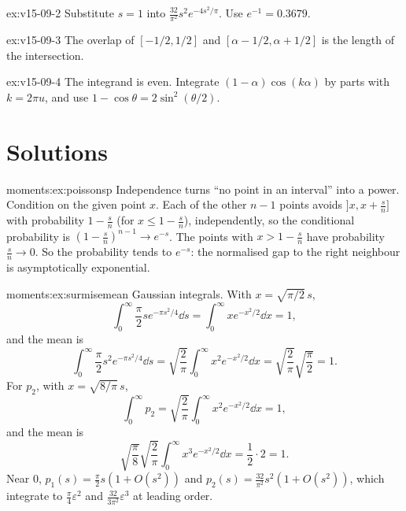\begin{hint}{ex:v15-09-2}
Substitute \(s=1\) into \(\frac{32}{\pi^2}s^2e^{-4s^2/\pi}\). Use \(e^{-1}=0.3679\).
\end{hint}

\begin{hint}{ex:v15-09-3}
The overlap of \([-1/2,1/2]\) and \([\alpha-1/2,\alpha+1/2]\) is the length of the intersection.
\end{hint}

\begin{hint}{ex:v15-09-4}
The integrand is even. Integrate \((1-\alpha)\cos(k\alpha)\) by parts with \(k=2\pi u\), and use \(1-\cos\theta=2\sin^2(\theta/2)\).
\end{hint}

\section{Solutions}



\begin{solution}{moments:ex:poissonsp}
\idea Independence turns ``no point in an interval'' into a power.
\writeup Condition on the given point $x$. Each of the other $n-1$ points avoids $]x,x+\frac sn]$ with probability $1-\frac sn$ (for $x\le1-\frac sn$), independently,
so the conditional probability is $(1-\frac sn)^{n-1}\to e^{-s}$. The points with $x>1-\frac sn$ have probability $\frac sn\to0$. So the probability tends to $e^{-s}$:
the normalised gap to the right neighbour is asymptotically exponential.
\end{solution}

\begin{solution}{moments:ex:surmisemean}
\idea Gaussian integrals.
\writeup With $x=\sqrt{\pi/2}\,s$,
\[
\int_0^\infty\frac\pi2se^{-\pi s^2/4}\dd s=\int_0^\infty xe^{-x^2/2}\dd x=1,
\]
and the mean is
\[
\int_0^\infty\frac\pi2s^2e^{-\pi s^2/4}\dd s=\sqrt{\frac2\pi}\int_0^\infty x^2e^{-x^2/2}\dd x=\sqrt{\frac2\pi}\sqrt{\frac\pi2}=1.
\]
For $p_2$, with $x=\sqrt{8/\pi}\,s$,
\[
\int_0^\infty p_2=\sqrt{\frac2\pi}\int_0^\infty x^2e^{-x^2/2}\dd x=1,
\]
and the mean is
\[
\sqrt{\frac\pi8}\sqrt{\frac2\pi}\int_0^\infty x^3e^{-x^2/2}\dd x=\frac12\cdot2=1.
\]
Near $0$,
$p_1(s)=\frac\pi2s(1+O(s^2))$ and $p_2(s)=\frac{32}{\pi^2}s^2(1+O(s^2))$, which integrate to $\frac\pi4\varepsilon^2$ and $\frac{32}{3\pi^2}\varepsilon^3$ at leading order.
\end{solution}

